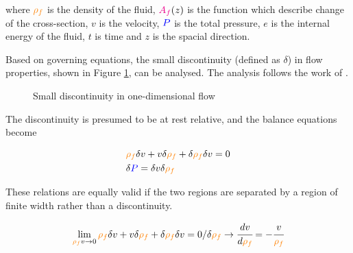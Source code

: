 \documentclass[a4paper,fleqn]{cas-dc}
\begin{document}
where ${\color{orange}\rho_f}$ is the density of the fluid, ${\color{magenta}A_f}(z)$ is the function which describe change of the cross-section, $v$ is the velocity, ${\color{blue}P}$ is the total pressure, $e$ is the internal energy of the fluid, $t$ is time and $z$ is the spacial direction.

Based on governing equations, the small discontinuity (defined as $\delta$) in flow properties, shown in Figure \ref{fig: Discontinuity_slow_flow}, can be analysed. The analysis follows the work of \citet{Schreier1982}.

\begin{figure}[!h]
	\centering
	\caption{Small discontinuity in one-dimensional flow}
	\label{fig: Discontinuity_slow_flow}
\end{figure} 

The discontinuity is presumed to be at rest relative, and the balance equations become		

{\footnotesize
	\begin{align*}
		&{\color{orange}\rho_f} \delta v + v \delta {\color{orange}\rho_f} + \delta {\color{orange}\rho_f} \delta v = 0 \\
		&\delta {\color{blue}P} = \delta v \delta {\color{orange}\rho_f}
	\end{align*}
}

These relations are equally valid if the two regions are separated by a region of finite width rather than a discontinuity. 

{\footnotesize
	\begin{equation*}
		\lim_{{\color{orange}\rho_f} v \rightarrow 0} {\color{orange}\rho_f} \delta v + v \delta {\color{orange}\rho_f} + \delta {\color{orange}\rho_f} \delta v = 0 / \delta {\color{orange}\rho_f} \rightarrow \cfrac{d v}{d {\color{orange}\rho_f}} = - \cfrac{v}{{\color{orange}\rho_f}}
	\end{equation*}
}
\end{document}
